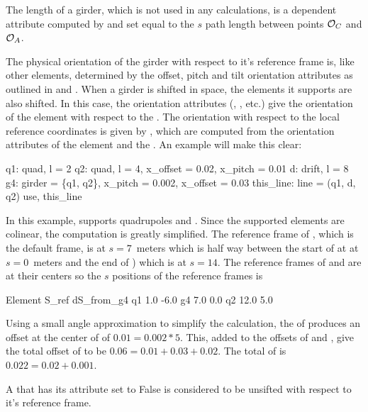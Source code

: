 The length  of a girder, which is not used in any calculations,
is a dependent attribute computed by \bmad and set equal to the $s$
path length between points ${\cal O}_C$ and ${\cal O}_A$.

The physical orientation of the girder with respect to it's reference
frame is, like other elements, determined by the offset, pitch and
tilt orientation attributes as outlined in  and
.  When a girder is shifted in space, the elements
it supports are also shifted.  In this case, the orientation
attributes (, , etc.) give the orientation of
the element with respect to the . The orientation with
respect to the local reference coordinates is given by
, which are computed from the orientation attributes
of the element and the . An example will make this clear:
\begin{example}
  q1: quad, l = 2
  q2: quad, l = 4, x_offset = 0.02, x_pitch = 0.01
  d: drift, l = 8
  g4: girder = \{q1, q2\}, x_pitch = 0.002, x_offset = 0.03
  this_line: line = (q1, d, q2)
  use, this_line
\end{example}
In this example,  supports quadrupoles  and .
Since the supported elements are colinear, the computation is greatly
simplified. The reference frame of , which is the default
 frame, is at $s = 7$~meters which is half way between the
start of  at at $s = 0$~meters and the end of ) which is
at $s = 14$. The reference frames of  and  are at their
centers so the $s$ positions of the reference frames is
\begin{example}
  Element        S_ref   dS_from_g4
  q1             1.0     -6.0
  g4             7.0      0.0
  q2            12.0      5.0
\end{example}
Using a small angle approximation to simplify the calculation, the
 of  produces an offset at the center of  of
$0.01 = 0.002 * 5$. This, added to the offsets of  and ,
give the total offset of  to be $0.06 = 0.01 + 0.03 + 0.02$.
The total  of  is $0.022 = 0.02 + 0.001$.

A  that has its  attribute set to False is considered to be
unsifted with respect to it's reference frame.

